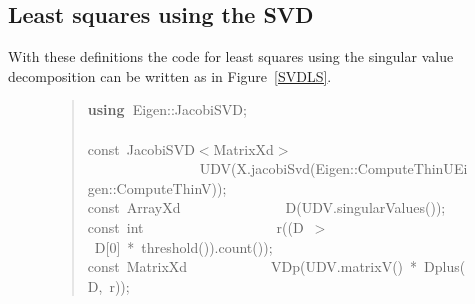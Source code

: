 \documentclass[shortnames,article]{jss}
\newcommand{\hlstd}[1]{\textcolor[rgb]{0,0,0}{#1}}
\newcommand{\hlnum}[1]{\textcolor[rgb]{0,0,0}{#1}}
\newcommand{\hlopt}[1]{\textcolor[rgb]{0,0,0}{#1}}
\newcommand{\hlkwa}[1]{\textcolor[rgb]{0.61,0.13,0.93}{\bf{#1}}}
\newcommand{\hlkwb}[1]{\textcolor[rgb]{0.13,0.54,0.13}{#1}}
\newcommand{\hlkwd}[1]{\textcolor[rgb]{0,0,0}{#1}}
\begin{document}

\subsection{Least squares using the SVD}
\label{sec:SVDls}

With these definitions the code for least squares using the singular
value decomposition can be written as in Figure~\ref{SVDLS}.
\begin{figure}[htb]
  \begin{quote}
    \noindent
    \ttfamily
    \hlstd{}\hlkwa{using\ }\hlstd{Eigen}\hlopt{::}\hlstd{JacobiSVD}\hlopt{;}\hspace*{\fill}\\
    \hlstd{}\hspace*{\fill}\\
    \hlkwb{const\ }\hlstd{JacobiSVD}\hlopt{$<$}\hlstd{MatrixXd}\hlopt{$>$}\hspace*{\fill}\\
    \hlstd{}\hlstd{\ \ \ \ \ \ \ \ \ \ \ \ \ \ \ \ }\hlstd{}\hlkwd{UDV}\hlstd{}\hlopt{(}\hlstd{X}\hlopt{.}\hlstd{}\hlkwd{jacobiSvd}\hlstd{}\hlopt{(}\hlstd{Eigen}\hlopt{::}\hlstd{ComputeThinU}\hlopt{\textbar }\hlstd{Eigen}\hlopt{::}\hlstd{ComputeThinV}\hlopt{));}\hspace*{\fill}\\
    \hlstd{}\hlkwb{const\ }\hlstd{ArrayXd}\hlstd{\ \ \ \ \ \ \ \ \ \ \ \ \ \ \ }\hlstd{}\hlkwd{D}\hlstd{}\hlopt{(}\hlstd{UDV}\hlopt{.}\hlstd{}\hlkwd{singularValues}\hlstd{}\hlopt{());}\hspace*{\fill}\\
    \hlstd{}\hlkwb{const\ int}\hlstd{\ \ \ \ \ \ \ \ \ \ \ \ \ \ \ \ \ \ \ }\hlkwb{}\hlstd{}\hlkwd{r}\hlstd{}\hlopt{((}\hlstd{D\ }\hlopt{$>$\ }\hlstd{D}\hlopt{{[}}\hlstd{}\hlnum{0}\hlstd{}\hlopt{{]}\ {*}\ }\hlstd{}\hlkwd{threshold}\hlstd{}\hlopt{()).}\hlstd{}\hlkwd{count}\hlstd{}\hlopt{());}\hspace*{\fill}\\
    \hlstd{}\hlkwb{const\ }\hlstd{MatrixXd}\hlstd{\ \ \ \ \ \ \ \ \ \ \ \ }\hlstd{}\hlkwd{VDp}\hlstd{}\hlopt{(}\hlstd{UDV}\hlopt{.}\hlstd{}\hlkwd{matrixV}\hlstd{}\hlopt{()\ {*}\ }\hlstd{}\hlkwd{Dplus}\hlstd{}\hlopt{(}\hlstd{D}\hlopt{,\ }\hlstd{r}\hlopt{));}\hspace*{\fill}\\

\end{quote}
\end{figure}
\end{document}
